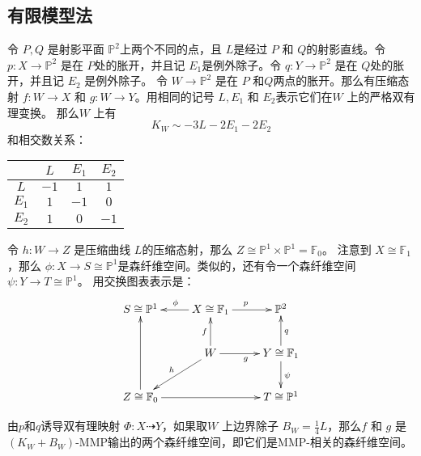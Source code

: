 \subsection{有限模型法}
令  $P,Q$ 是射影平面 $\mathbb{P}^{2}$上两个不同的点，且 $L$是经过 $P$ 和 $Q$的射影直线。令 $p:X\to \mathbb{P}^{2}$ 是在 $P$处的胀开，并且记 $E_{1}$是例外除子。令 $q:Y\to \mathbb{P}^{2}$ 是在 $Q$处的胀开，并且记 $E_{2}$ 是例外除子。 令 $W\to \mathbb{P}^{2}$ 是在  $P$ 和$Q$两点的胀开。那么有压缩态射 $f:W\to X$ 和 $g:W\to Y$。用相同的记号 $L,E_{1}$ 和 $E_{2}$表示它们在$W$ 上的严格双有理变换。 那么$W$ 上有
\[
  K_{W}\sim -3L-2E_{1}-2E_{2}
\]
和相交数关系： 
\begin{table}[!htbp]
  {\centering
    \begin{tabular}{cccc}
        \hline
                 & $L$  & $E_{1}$ & $E_{2}$ \\
        \hline
        $L$      & $-1$ & $1$     & $1$ \\
        $E_{1}$  & $1$  & $-1$    & $0$ \\
        $E_{2}$  & $1$  & $0$     & $-1$ \\
        \hline
    \end{tabular}
  }
\end{table}
令  $h:W\to Z$ 是压缩曲线 $L$的压缩态射，那么 $Z\cong \mathbb{P}^{1} \times \mathbb{P}^{1}=\mathbb{F}_{0}$。 注意到 $X\cong \mathbb{F}_{1}$，那么 $\phi:X\to S \cong \mathbb{P}^{1}$是森纤维空间。类似的，还有令一个森纤维空间 $\psi: Y\to T\cong \mathbb{P}^{1}$。 用交换图表表示是：
\[ \xymatrix{
    S\cong \mathbb{P}^{1}&X\cong \mathbb{F}_{1}\ar[l]_{\phi}\ar[r]^{p} & \mathbb{P}^{2} \\
    &W\ar[u]^{f}\ar[r]_{g}\ar[ld]_{h} & Y\cong \mathbb{F}_{1}\ar[u]_{q}\ar[d]^{\psi}\\
    Z\cong \mathbb{F}_{0}\ar[uu]\ar[rr]&&T\cong \mathbb{P}^{1} } \]

由$p$和$q$诱导双有理映射 $\Phi: X\dashrightarrow  Y$，如果取$W$ 上边界除子 $B_{W}=\frac{1}{4}L$，那么$f$ 和 $g$ 是 $(K_{W}+B_{W})$-MMP输出的两个森纤维空间，即它们是MMP-相关的森纤维空间。

